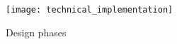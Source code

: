 \begin{figure}[h]
	\centering 
	\texttt{[image: technical\_implementation]}
	\caption{Design phases}\label{fig:technical_implementation}
\end{figure}

